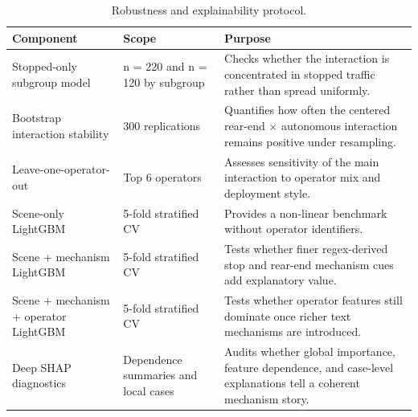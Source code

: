 \begin{table}[H]
\centering
\caption{Robustness and explainability protocol.}
\label{tab:robustness_protocol}
\scriptsize
\renewcommand{\arraystretch}{1.08}
\begin{tabular}{p{3.1cm}p{2.6cm}p{6.4cm}}
\toprule
Component & Scope & Purpose \\
\midrule
Stopped-only subgroup model & n = 220 and n = 120 by subgroup & Checks whether the interaction is concentrated in stopped traffic rather than spread uniformly. \\
Bootstrap interaction stability & 300 replications & Quantifies how often the centered rear-end × autonomous interaction remains positive under resampling. \\
Leave-one-operator-out & Top 6 operators & Assesses sensitivity of the main interaction to operator mix and deployment style. \\
Scene-only LightGBM & 5-fold stratified CV & Provides a non-linear benchmark without operator identifiers. \\
Scene + mechanism LightGBM & 5-fold stratified CV & Tests whether finer regex-derived stop and rear-end mechanism cues add explanatory value. \\
Scene + mechanism + operator LightGBM & 5-fold stratified CV & Tests whether operator features still dominate once richer text mechanisms are introduced. \\
Deep SHAP diagnostics & Dependence summaries and local cases & Audits whether global importance, feature dependence, and case-level explanations tell a coherent mechanism story. \\
\bottomrule
\end{tabular}
\end{table}
